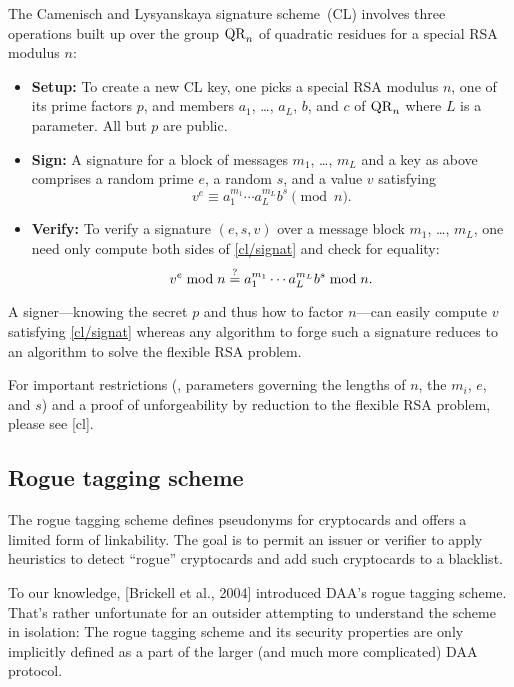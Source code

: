 The Camenisch and Lysyanskaya signature scheme~(CL)
involves three operations built up over the group $\mathrm{QR}_n$
of quadratic residues for a special RSA modulus $n$:
\begin{itemize}

\item \textbf{Setup:} To create a new CL key,
one picks a special RSA modulus $n$, one of its prime
factors $p$,
and members $a_1$, \ldots, $a_L$, $b$, and $c$ of $\mathrm{QR}_n$
where $L$ is a parameter.
All but $p$ are public.

\item \textbf{Sign:}
A signature for a block of messages $m_1$, \ldots, $m_L$
and a key as above comprises a random prime $e$, a random $s$, and a
value $v$ satisfying
\begin{equation}\label{cl/signat}
	v^e \equiv a_1^{m_1} \cdots a_L^{m_L} b^s \pmod n.
\end{equation}

\item \textbf{Verify:}
To verify a signature $(e, s, v)$ over a message block $m_1$, \ldots, $m_L$,
one need only compute both sides of \eqref{cl/signat} and check for equality:
$$	
	v^e \bmod n \mathrel{\overset{\mathrm{?}}{=}} a_1^{m_1} \cdots a_L^{m_L} b^s \bmod n.
$$
\end{itemize}
A signer---knowing the secret $p$ and thus how to factor $n$---can
easily compute $v$ satisfying \eqref{cl/signat}
whereas any algorithm to forge such a signature
reduces to an algorithm to solve the flexible RSA problem.

For important restrictions (\ie, parameters
governing the lengths of $n$, the $m_i$, $e$, and
$s$) and a proof of unforgeability by reduction to the flexible RSA problem, please
see [cl].

\subsection{Rogue tagging scheme}

The rogue tagging scheme defines pseudonyms for cryptocards and offers
a limited form of linkability.
The goal is to permit an issuer or verifier to apply heuristics to detect ``rogue'' cryptocards
and add such cryptocards to a blacklist.

To our knowledge, [Brickell et al., 2004] introduced DAA's rogue tagging scheme.
That's rather unfortunate for an outsider attempting to understand the scheme in isolation:
The rogue tagging scheme and its security properties are only implicitly defined as a part of the larger (and much more complicated) DAA protocol.

